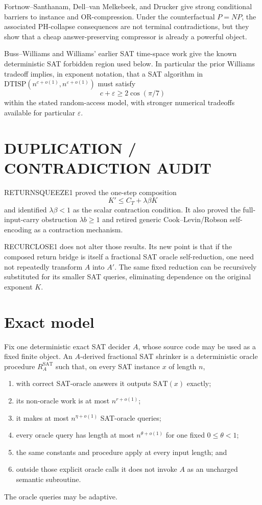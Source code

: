 \documentclass[11pt]{article}
\begin{document}
Fortnow--Santhanam, Dell--van Melkebeek, and Drucker give strong conditional barriers to instance and OR-compression. Under the counterfactual \(P=NP\), the associated PH-collapse consequences are not terminal contradictions, but they show that a cheap answer-preserving compressor is already a powerful object.

Buss--Williams and Williams' earlier SAT time-space work give the known deterministic SAT forbidden region used below. In particular the prior Williams tradeoff implies, in exponent notation, that a SAT algorithm in \(\mathrm{DTISP}(n^{c+o(1)},n^{\varepsilon+o(1)})\) must satisfy
\[
c+\varepsilon\ge 2\cos(\pi/7)
\]
within the stated random-access model, with stronger numerical tradeoffs available for particular \(\varepsilon\).

\section*{DUPLICATION / CONTRADICTION AUDIT}
RETURNSQUEEZE1 proved the one-step composition
\[
K'\le C_T+\lambda\beta K
\]
and identified \(\lambda\beta<1\) as the scalar contraction condition. It also proved the full-input-carry obstruction \(\lambda b\ge1\) and retired generic Cook--Levin/Robson self-encoding as a contraction mechanism.

RECURCLOSE1 does not alter those results. Its new point is that if the composed return bridge is itself a fractional SAT oracle self-reduction, one need not repeatedly transform \(A\) into \(A'\). The same fixed reduction can be recursively substituted for its smaller SAT queries, eliminating dependence on the original exponent \(K\).

\section*{Exact model}
Fix one deterministic exact SAT decider \(A\), whose source code may be used as a fixed finite object. An \(A\)-derived fractional SAT shrinker is a deterministic oracle procedure \(R_A^{\mathrm{SAT}}\) such that, on every SAT instance \(x\) of length \(n\),
\begin{enumerate}
\item with correct SAT-oracle answers it outputs \(\mathrm{SAT}(x)\) exactly;
\item its non-oracle work is at most \(n^{r+o(1)}\);
\item it makes at most \(n^{\eta+o(1)}\) SAT-oracle queries;
\item every oracle query has length at most \(n^{\theta+o(1)}\) for one fixed \(0\le\theta<1\);
\item the same constants and procedure apply at every input length; and
\item outside those explicit oracle calls it does not invoke \(A\) as an uncharged semantic subroutine.
\end{enumerate}
The oracle queries may be adaptive.
\end{document}

